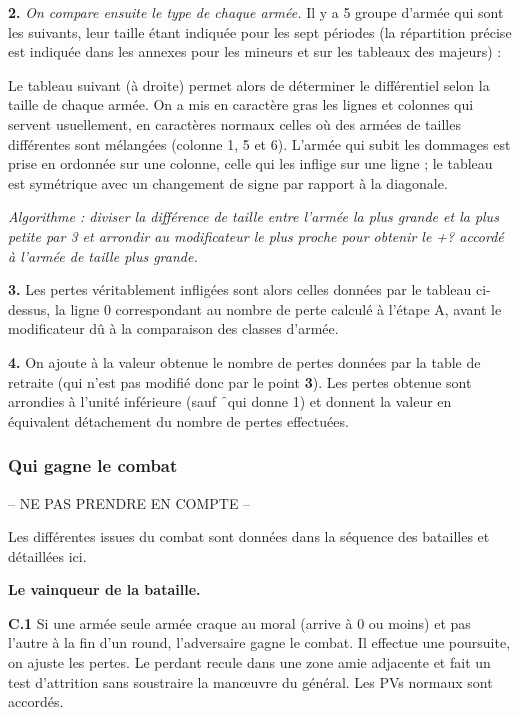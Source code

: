 {\bf 2.}
\textit{On compare ensuite le type de chaque armée.} Il y a 5 groupe d'armée qui sont
les suivants, leur taille étant indiquée pour les sept périodes (la répartition précise est
indiquée dans les annexes pour les mineurs et sur les tableaux des majeurs) :


Le tableau suivant (à droite) permet alors de déterminer le différentiel selon la taille de
chaque armée. On a mis en caractère gras les lignes et colonnes qui servent
usuellement, en caractères normaux celles où des armées
de tailles différentes sont mélangées (colonne 1, 5 et 6).
L'armée qui subit les
dommages est prise en ordonnée sur une colonne, celle qui les inflige sur une
ligne ; le tableau est
symétrique avec un changement de signe par rapport à la diagonale.


\textit{Algorithme : diviser la différence de taille entre l'armée la plus grande et la plus
petite par 3 et arrondir au modificateur le plus proche pour obtenir le +?
accordé à l'armée de taille plus grande.}


{\bf 3.}
Les pertes véritablement infligées sont alors celles données par le tableau
ci-dessus, la ligne 0 correspondant au nombre de perte calculé à l'étape A,
avant le modificateur
dû à la comparaison des classes d'armée.


{\bf 4.}
On ajoute à la valeur obtenue le nombre de pertes données par la table de
retraite (qui n'est pas modifié donc par le point {\bf 3}).
Les pertes obtenue sont arrondies à l'unité inférieure (sauf \f\ qui donne 1)
et donnent la valeur en équivalent détachement du nombre de pertes effectuées.


\subsubsection{Qui gagne le combat}
-- NE PAS PRENDRE EN COMPTE --


Les différentes issues du combat sont données dans la séquence des batailles et
détaillées ici.

\textbf{Le vainqueur de la bataille.}

{\bf C.1} Si une armée seule armée craque au moral (arrive à 0 ou moins) et pas l'autre à la fin
d'un round, l'adversaire gagne le combat. Il effectue une poursuite, on ajuste les
pertes. Le perdant recule dans une zone amie adjacente et fait un test d'attrition
sans soustraire la man{\oe}uvre du général. Les PVs normaux sont accordés.

